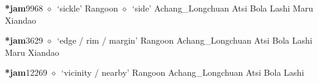   \begin{list}{}{\leftmargin=1.5em \itemindent=-1.5em}
  \item {\footnotesize \textbf{*jam}}{\tiny 9968}
         $\diamond$~`sickle'
         Rangoon 
\hspace{1ex}
         $\diamond$~`side'
         Achang\_Longchuan 
\hspace{1ex}
         Atsi 
\hspace{1ex}
         Bola 
\hspace{1ex}
         Lashi 
\hspace{1ex}
         Maru 
\hspace{1ex}
         Xiandao 
  \item {\footnotesize \textbf{*jam}}{\tiny 3629}
\hspace{1ex}
         $\diamond$~`edge / rim / margin'
         Rangoon 
\hspace{1ex}
         Achang\_Longchuan 
\hspace{1ex}
         Atsi 
\hspace{1ex}
         Bola 
\hspace{1ex}
         Lashi 
\hspace{1ex}
         Maru 
\hspace{1ex}
         Xiandao 
  \item {\footnotesize \textbf{*jam}}{\tiny 12269}
\hspace{1ex}
         $\diamond$~`vicinity / nearby'
         Rangoon 
\hspace{1ex}
         Achang\_Longchuan 
\hspace{1ex}
         Atsi 
\hspace{1ex}
         Bola 
\hspace{1ex}
         Lashi 

\end{list}
